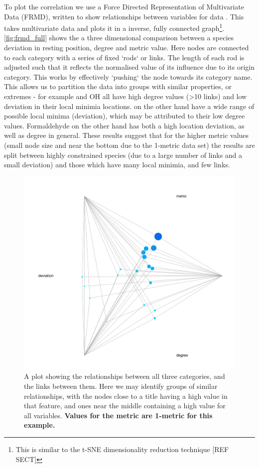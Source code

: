  
 To plot the correlation we use a Force Directed Representation of Multivariate Data (FRMD), written to show relationships between variables for data \cite{frmd}. This takes multivariate data and plots it in a inverse, fully connected graph\footnote{This is similar to the t-SNE dimensionality reduction technique [REF SECT]}. \autoref{fig:frmd_full} shows the a three dimensional comparison between a species deviation in resting position, degree and metric value.  Here nodes are connected to each category with a series of fixed `rods` or links. The length of each rod is adjusted such that it reflects the normalised value of its influence due to its origin category. This works by effectively `pushing` the node towards its category name. This allows us to partition the data into groups with similar properties, or extremes - for example  and OH all have high degree values (>10 links) and low deviation in their local minimia locations.  on the other hand have a wide range of possible local minima (deviation), which may be attributed to their low degree values. Formaldehyde on the other hand has both a high location deviation, as well as degree in general. These results suggest that for the higher metric values (small node size and near the bottom due to the 1-metric data set) the results are split between highly constrained species (due to a large number of links and a small deviation) and those which have many local minimia, and few links. 
 
 
 
 \begin{figure}[H]
     \centering
     \includegraphics[width=.8\textwidth]{figures_c1/fullold.png}\vspace*{+0mm} 
     \caption{A plot showing the relationships between all three categories, and the links between them. Here we may identify groups of similar relationships, with the nodes close to a title having a high value in that feature, and ones near the middle containing a high value for all variables. \textbf{Values for the metric are 1-metric for this example.} }
     \label{fig:frmd_full}
     \end{figure}
     
